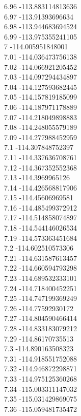 {6.96	-113.883114813636\\
6.97	-113.91393696634\\
6.98	-113.944683694524\\
6.99	-113.975355241105\\
7	-114.005951848001\\
7.01	-114.036473756138\\
7.02	-114.066921205452\\
7.03	-114.097294434897\\
7.04	-114.127593682445\\
7.05	-114.157819185099\\
7.06	-114.187971178889\\
7.07	-114.218049898883\\
7.08	-114.248055579189\\
7.09	-114.277988452959\\
7.1	-114.307848752397\\
7.11	-114.337636708761\\
7.12	-114.367352552368\\
7.13	-114.3969965126\\
7.14	-114.426568817906\\
7.15	-114.45606969581\\
7.16	-114.485499372912\\
7.17	-114.514858074897\\
7.18	-114.544146026534\\
7.19	-114.573363451684\\
7.2	-114.602510573306\\
7.21	-114.631587613457\\
7.22	-114.660594793298\\
7.23	-114.689532333101\\
7.24	-114.718400452251\\
7.25	-114.747199369249\\
7.26	-114.77592930172\\
7.27	-114.804590466414\\
7.28	-114.833183079212\\
7.29	-114.86170735513\\
7.3	-114.890163508323\\
7.31	-114.918551752088\\
7.32	-114.946872298871\\
7.33	-114.975125360268\\
7.34	-115.003311147032\\
7.35	-115.031429869075\\
7.36	-115.059481735472\\
}
